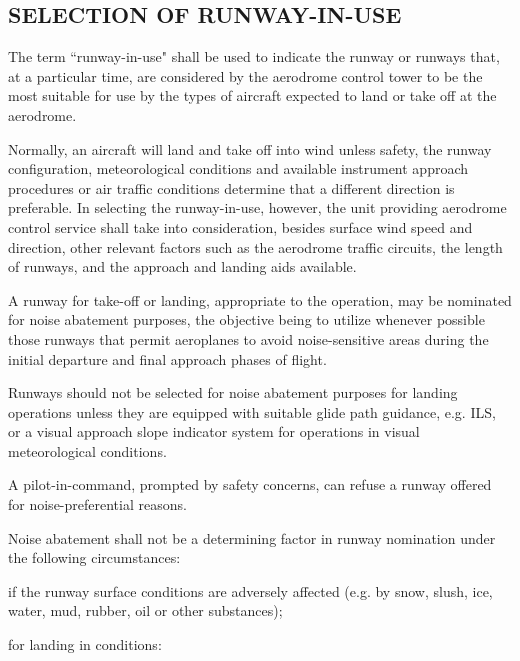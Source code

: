 
\subsection[Selection of runway-in-use]{SELECTION OF RUNWAY-IN-USE}

\begin{enumnoss}
    \item The term ``runway-in-use" shall be used to indicate the runway or runways that, at a particular time, are considered by the aerodrome control tower to be the most suitable for use by the types of aircraft expected to land or take off at the aerodrome.
    \item Normally, an aircraft will land and take off into wind unless safety, the runway configuration, meteorological conditions and available instrument approach procedures or air traffic conditions determine that a different direction is preferable. In selecting the runway-in-use, however, the unit providing aerodrome control service shall take into consideration, besides surface wind speed and direction, other relevant factors such as the aerodrome traffic circuits, the length of runways, and the approach and landing aids available.
    \item A runway for take-off or landing, appropriate to the operation, may be nominated for noise abatement purposes, the objective being to utilize whenever possible those runways that permit aeroplanes to avoid noise-sensitive areas during the initial departure and final approach phases of flight.
    \item Runways should not be selected for noise abatement purposes for landing operations unless they are equipped with suitable glide path guidance, e.g. ILS, or a visual approach slope indicator system for operations in visual meteorological conditions.
    \item A pilot-in-command, prompted by safety concerns, can refuse a runway offered for noise-pref\-er\-en\-tial reasons.
    \item Noise abatement shall not be a determining factor in runway nomination under the following circumstances:

    \begin{enumalph}
        \item if the runway surface conditions are adversely affected (e.g. by snow, slush, ice, water, mud, rubber, oil or other substances);
        \item for landing in conditions:


\end{enumalph}
\end{enumnoss}
